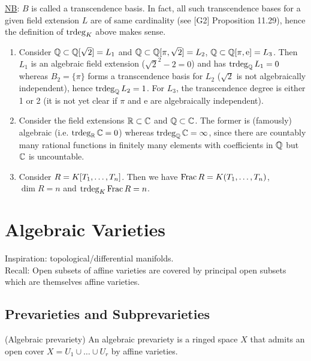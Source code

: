 \documentclass[a4paper,11pt]{article}
\begin{document}
{				\noindent\underline{NB}: $B$ is called a transcendence basis. In fact, all such transcendence bases for a given field extension $L$ are of same cardinality (see [G2] Proposition 11.29), hence the definition of $\operatorname{trdeg}_K$ above makes sense.

				\begin{eg}
					\begin{enumerate}
						\item Consider $\mathbb{Q}\subset\mathbb{Q}[\sqrt{2}]=L_1$ and $\mathbb{Q}\subset\mathbb{Q}[\pi,\sqrt{2}]=L_2$, $\mathbb{Q}\subset\mathbb{Q}[\pi,\mathrm{e}]=L_3$. Then $L_1$ is an algebraic field extension ($\sqrt{2}^2-2=0$) and has $\operatorname{trdeg}_{\mathbb{Q}} L_1=0$ whereas $B_2=\{\pi\}$ forms a transcendence basis for $L_2$ ($\sqrt{2}$ is not algebraically independent), hence $\operatorname{trdeg}_{\mathbb{Q}} L_2=1$. For $L_3$, the transcendence degree is either 1 or 2 (it is not yet clear if $\pi$ and $\mathrm{e}$ are algebraically independent). 
						\item Consider the field extensions $\mathbb{R}\subset\mathbb{C}$ and $\mathbb{Q}\subset\mathbb{C}$. The former is (famously) algebraic (i.e. $\operatorname{trdeg}_{\mathbb{R}} \mathbb{C}=0$) whereas $\operatorname{trdeg}_{\mathbb{Q}} \mathbb{C}=\infty$, since there are countably many rational functions in finitely many elements with coefficients in $\mathbb{Q}$ but $\mathbb{C}$ is uncountable. 
						\item Consider $R=K[T_1,\dots,T_{n}]$. Then we have $\operatorname{Frac} R=K(T_1,\dots,T_n)$, $\dim R=n$ and $\operatorname{trdeg}_K\operatorname{Frac}  R=n$.
					\end{enumerate}
				\end{eg}
			
			}



	\section{Algebraic Varieties}

		\noindent Inspiration: topological/differential manifolds.
		\\

		\noindent Recall: Open subsets of affine varieties are covered by principal open subsets which are themselves affine varieties.

	
		\subsection{Prevarieties and Subprevarieties}

			\begin{defi}
				(Algebraic prevariety) An algebraic prevariety is a ringed space $X$ that admits an open cover $X=U_1\cup\dots\cup U_r$ by affine varieties.
			\end{defi}
\end{document}
